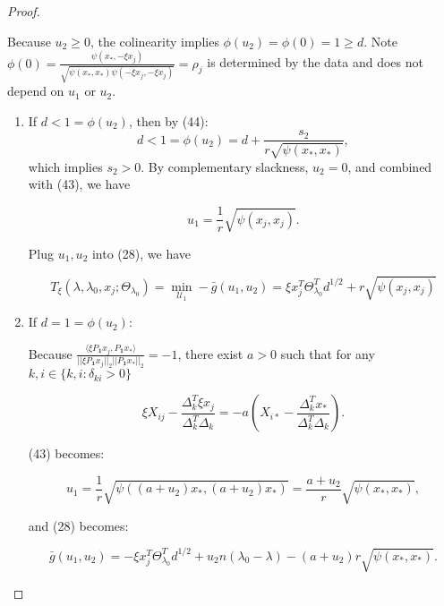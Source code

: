 \documentclass{article}
\begin{document}
\begin{proof}
\begin{enumerate}
    Because $u_2\geq0$, the colinearity implies $\phi(u_2)=\phi(0)=1\geq d$. Note $\phi(0)=\frac{\psi(x_*,-\xi x_j)}{\sqrt{\psi(x_*,x_*)\psi(-\xi x_j,-\xi x_j)}}=\rho_j$ is determined by the data and does not depend on $u_1$ or $u_2$.
    
    \begin{enumerate}
        \item If $d<1=\phi(u_2)$, then by (44):
        \begin{equation}
            d<1=\phi(u_2)=d+\frac{s_2}{r\sqrt{\psi(x_*,x_*)}},
        \end{equation}
        which implies $s_2>0$. By complementary slackness, $u_2=0$, and combined with (43), we have
        
        \begin{equation}
            u_1=\frac{1}{r}\sqrt{\psi(x_j,x_j)}.
        \end{equation}
        
        Plug $u_1,u_2$ into (28), we have
        
        \begin{equation}
            T_\xi(\lambda,\lambda_0,x_j;\Theta_{\lambda_0})=\min_{\mathcal{U}_1}-\bar{g}(u_1,u_2)=\xi x_j^T\Theta_{\lambda_0}^Td^{1/2}+r\sqrt{\psi(x_j,x_j)}
        \end{equation}
        
        \item If $d=1=\phi(u_2)$:
        
        Because $\frac{\langle\xi P_{\mathbf{1}}x_j,P_{\mathbf{1}}x_*\rangle}{||\xi P_{\mathbf{1}}x_j||_2||P_{\mathbf{1}}x_*||_2}=-1$, there exist $a>0$ such that for any $k,i\in\{k,i:\delta_{ki}>0\}$
        
        \begin{equation}
            \xi X_{ij}-\frac{\Delta_k^T\xi x_j}{\Delta_k^T\Delta_k}=-a\left(X_{i*}-\frac{\Delta_k^Tx_*}{\Delta_k^T\Delta_k}\right).
        \end{equation}
        
        (43) becomes:
        
        \begin{equation}
            u_1=\frac{1}{r}\sqrt{\psi\left((a+u_2)x_*,(a+u_2)x_*\right)}=\frac{a+u_2}{r}\sqrt{\psi(x_*,x_*)},
        \end{equation}
        
        and (28) becomes:
        
        \begin{equation}
            \bar{g}(u_1,u_2)=-\xi x_j^T\Theta_{\lambda_0}^Td^{1/2}+u_2n(\lambda_0-\lambda)-(a+u_2)r\sqrt{\psi(x_*,x_*)}.
        \end{equation}
        

\end{enumerate}
\end{enumerate}
\end{proof}
\end{document}
